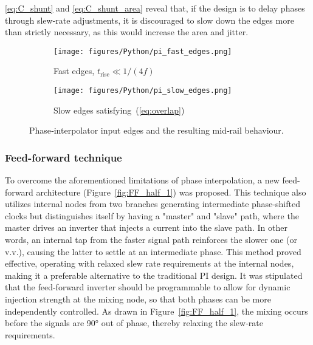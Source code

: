 \ref{eq:C_shunt} and \ref{eq:C_shunt_area} reveal that, if the design is to delay phases through slew-rate adjustments, it is discouraged to slow down the edges more than strictly necessary, as this would increase the area and jitter.

\begin{figure}[h]
  \centering
  \begin{subfigure}[b]{0.40\linewidth}
    \centering
    \texttt{[image: figures/Python/pi\_fast\_edges.png]}
    \caption{Fast edges, $t_{\text{rise}}\!\ll\!1/(4f)$}
    \label{fig:fast}
  \end{subfigure}
  \hfill
  \begin{subfigure}[b]{0.40\linewidth}
    \centering
    \texttt{[image: figures/Python/pi\_slow\_edges.png]}
    \caption{Slow edges satisfying (\ref{eq:overlap})}
    \label{fig:slow}
  \end{subfigure}
  \caption{Phase‑interpolator input edges and the resulting
           mid‑rail behaviour.}
  \label{fig:pi_edges}
\end{figure}

\subsubsection{Feed-forward technique}\label{sec:feedforward}
To overcome the aforementioned limitations of phase interpolation, a new feed-forward architecture (Figure~\ref{fig:FF_half_1}) was proposed. This technique also utilizes internal nodes from two branches generating intermediate phase-shifted clocks but distinguishes itself by having a "master" and "slave" path, where the master drives an inverter that injects a current into the slave path. In other words, an internal tap from the faster signal path reinforces the slower one (or v.v.), causing the latter to settle at an intermediate phase. This method proved effective, operating with relaxed slew rate requirements at the internal nodes, making it a preferable alternative to the traditional PI design. It was stipulated that the feed-forward inverter should be programmable to allow for dynamic injection strength at the mixing node, so that both phases can be more independently controlled. As drawn in Figure~\ref{fig:FF_half_1}, the mixing occurs before the signals are \ang{90} out of phase, thereby relaxing the slew‑rate requirements.

